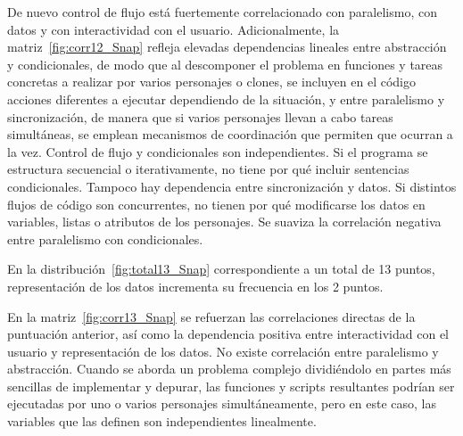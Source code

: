 \documentclass[a4paper, 12pt]{book}
\begin{document}
De nuevo control de flujo está fuertemente correlacionado con paralelismo, con datos y con interactividad con el usuario. Adicionalmente, la matriz~\ref{fig:corr12_Snap} refleja elevadas dependencias lineales entre abstracción y condicionales, de modo que al descomponer el problema en funciones y tareas concretas a realizar por varios personajes o clones, se incluyen en el código acciones diferentes a ejecutar dependiendo de la situación, y entre paralelismo y sincronización, de manera que si varios personajes llevan a cabo tareas simultáneas, se emplean mecanismos de coordinación que permiten que ocurran a la vez. Control de flujo y condicionales son independientes.
Si el programa se estructura secuencial o iterativamente, no tiene por qué incluir sentencias condicionales. Tampoco hay dependencia  entre sincronización y datos. Si distintos flujos de código son concurrentes, no tienen por qué modificarse los datos en variables, listas o atributos de los personajes. Se suaviza la correlación negativa entre paralelismo con condicionales.

En la distribución~\ref{fig:total13_Snap} correspondiente a un total de 13 puntos, representación de los datos incrementa su frecuencia en los 2 puntos.

En la matriz~\ref{fig:corr13_Snap} se refuerzan las correlaciones directas de la puntuación anterior, así como la dependencia positiva entre interactividad con el usuario y representación de los datos. No existe correlación entre paralelismo y abstracción. Cuando se aborda un problema complejo dividiéndolo en partes más sencillas de implementar y depurar, las funciones y scripts resultantes podrían ser ejecutadas por uno o varios personajes simultáneamente, pero en este caso, las variables que las definen son independientes linealmente. %
\end{document}
